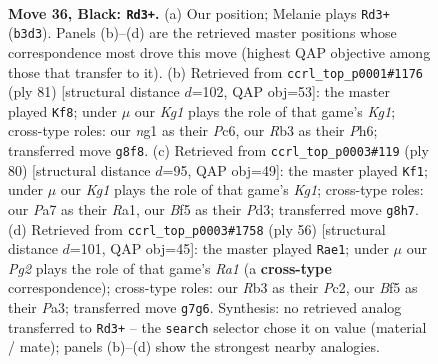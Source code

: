 \documentclass[11pt]{article}
\begin{document}
\clearpage

\begin{figure}[p]\centering
\begin{subfigure}{0.46\textwidth}\centering
\resizebox{\linewidth}{!}{%
\newchessgame
\chessboard[
  setfen={6k1/p1p2pp1/7p/4rb1P/p1P3n1/1r6/3KR3/n1B2BN1 b - - 3 36},
  showmover=false,
  pgfstyle=straightmove, color=movearrow, markmove={b3-d3}
]}
\caption{}
\end{subfigure}\hfill
\begin{subfigure}{0.46\textwidth}\centering
\resizebox{\linewidth}{!}{%
\newchessgame
\chessboard[
  setfen={6k1/1p3pp1/2p4p/p2r4/1n6/4B1P1/1P1RK3/5B2 b - - 10 41},
  showmover=false,
  pgfstyle=straightmove, color=movearrow, markmove={g8-f8}
]}
\caption{}
\end{subfigure}
\\[4pt]
\begin{subfigure}{0.46\textwidth}\centering
\resizebox{\linewidth}{!}{%
\newchessgame
\chessboard[
  setfen={1r6/4r1k1/6bn/2N5/2NnB1p1/3P2Pp/5R1P/R5K1 w - - 1 41},
  showmover=false,
  pgfstyle=straightmove, color=movearrow, markmove={g1-f1}
]}
\caption{}
\end{subfigure}\hfill
\begin{subfigure}{0.46\textwidth}\centering
\resizebox{\linewidth}{!}{%
\newchessgame
\chessboard[
  setfen={4r1k1/pp1b3r/7p/4R3/3p4/P4N2/2P3PP/R5K1 w - - 3 29},
  showmover=false,
  pgfstyle=straightmove, color=movearrow, markmove={a1-e1}
]}
\caption{}
\end{subfigure}
\caption{\textbf{Move 36, Black: \texttt{Rd3+}.} (a) Our position; Melanie plays \texttt{Rd3+} (\texttt{b3d3}). Panels (b)--(d) are the retrieved master positions whose correspondence most drove this move (highest QAP objective among those that transfer to it). (b) Retrieved from \texttt{ccrl\_top\_p0001\#1176} (ply 81) [structural distance $d$=102, QAP obj=53]: the master played \texttt{Kf8}; under $\mu$ our \emph{Kg1} plays the role of that game's \emph{Kg1}; cross-type roles: our \emph{n}g1 as their \emph{P}c6, our \emph{R}b3 as their \emph{P}h6; transferred move \texttt{g8f8}. (c) Retrieved from \texttt{ccrl\_top\_p0003\#119} (ply 80) [structural distance $d$=95, QAP obj=49]: the master played \texttt{Kf1}; under $\mu$ our \emph{Kg1} plays the role of that game's \emph{Kg1}; cross-type roles: our \emph{P}a7 as their \emph{R}a1, our \emph{B}f5 as their \emph{P}d3; transferred move \texttt{g8h7}. (d) Retrieved from \texttt{ccrl\_top\_p0003\#1758} (ply 56) [structural distance $d$=101, QAP obj=45]: the master played \texttt{Rae1}; under $\mu$ our \emph{Pg2} plays the role of that game's \emph{Ra1} (a \textbf{cross-type} correspondence); cross-type roles: our \emph{R}b3 as their \emph{P}c2, our \emph{B}f5 as their \emph{P}a3; transferred move \texttt{g7g6}. Synthesis: no retrieved analog transferred to \texttt{Rd3+} -- the \texttt{search} selector chose it on value (material / mate); panels (b)--(d) show the strongest nearby analogies.}
\label{fig:thought-m71}
\end{figure}
\end{document}

